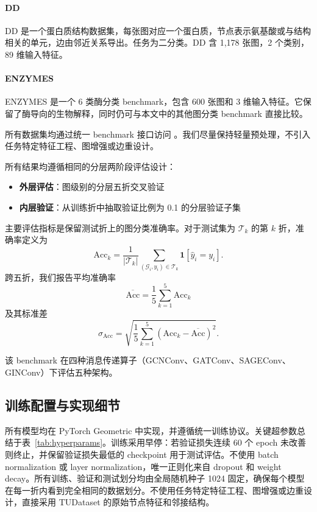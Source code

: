 \paragraph{DD}
DD 是一个蛋白质结构数据集，每张图对应一个蛋白质，节点表示氨基酸或与结构相关的单元，边由邻近关系导出。任务为二分类。DD 含 1,178 张图，2 个类别，89 维输入特征。

\paragraph{ENZYMES}
ENZYMES 是一个 6 类酶分类 benchmark，包含 600 张图和 3 维输入特征。它保留了酶导向的生物解释，同时仍可与本文中的其他图分类 benchmark 直接比较。



所有数据集均通过统一 benchmark 接口访问 \cite{fey2019fast,morris2020tudataset}。我们尽量保持轻量预处理，不引入任务特定特征工程、图增强或边重设计。

所有结果均遵循相同的分层两阶段评估设计：
\begin{itemize}
    \item \textbf{外层评估}：图级别的分层五折交叉验证
    \item \textbf{内层验证}：从训练折中抽取验证比例为 0.1 的分层验证子集
\end{itemize}

主要评估指标是保留测试折上的图分类准确率。对于测试集为 $\mathcal{T}_k$ 的第 $k$ 折，准确率定义为
\begin{equation}
\mathrm{Acc}_k = \frac{1}{|\mathcal{T}_k|}\sum_{(\mathcal{G}_i,y_i)\in\mathcal{T}_k}\mathbf{1}\!\left[\hat{y}_i = y_i\right].
\end{equation}
跨五折，我们报告平均准确率
\begin{equation}
\overline{\mathrm{Acc}} = \frac{1}{5}\sum_{k=1}^{5}\mathrm{Acc}_k
\end{equation}
及其标准差
\begin{equation}
\sigma_{\mathrm{Acc}} = \sqrt{\frac{1}{5}\sum_{k=1}^{5}\left(\mathrm{Acc}_k-\overline{\mathrm{Acc}}\right)^2 }.
\end{equation}

该 benchmark 在四种消息传递算子（GCNConv、GATConv、SAGEConv、GINConv）下评估五种架构。

\subsection{训练配置与实现细节}

所有模型均在 PyTorch Geometric \cite{fey2019fast} 中实现，并遵循统一训练协议。关键超参数总结于表~\ref{tab:hyperparams}。训练采用早停：若验证损失连续 60 个 epoch 未改善则终止，并保留验证损失最低的 checkpoint 用于测试评估。不使用 batch normalization 或 layer normalization，唯一正则化来自 dropout 和 weight decay。所有训练、验证和测试划分均由全局随机种子 1024 固定，确保每个模型在每一折内看到完全相同的数据划分。不使用任务特定特征工程、图增强或边重设计，直接采用 TUDataset 的原始节点特征和邻接结构。

